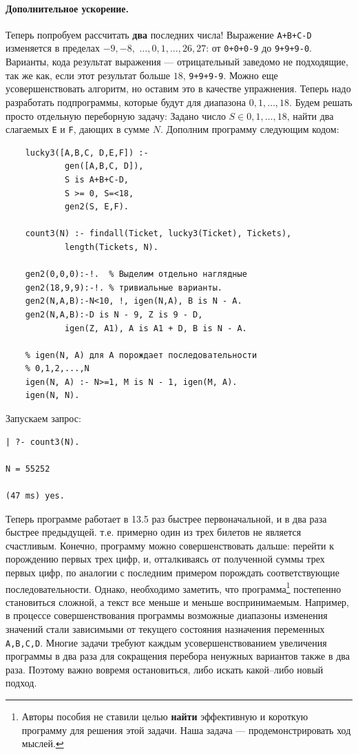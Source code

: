 \documentclass[12pt, openany, oneside]{book} %
\begin{document}
\paragraph{Дополнительное ускорение.} Теперь попробуем рассчитать \textbf{два} последних числа! Выражение \texttt{A+B+C-D} изменяется в пределах $-9,-8,$ $\ldots,0,1,\ldots,26,27$: от \texttt{0+0+0-9} до \texttt{9+9+9-0}. Варианты, кода результат выражения --- отрицательный заведомо не подходящие, так же как, если этот результат больше $18$, \texttt{9+9+9-9}. Можно еще усовершенствовать алгоритм, но оставим это в качестве упражнения. Теперь надо разработать подпрограммы, которые будут для диапазона $0,1,\ldots,18$. Будем решать просто отдельную переборную задачу: Задано число $S \in 0,1,\ldots,18$, найти два слагаемых \texttt{E} и \texttt{F}, дающих в сумме $N$. Дополним программу следующим кодом:
{\tt\begin{verbatim}
    lucky3([A,B,C, D,E,F]) :-
            gen([A,B,C, D]),
            S is A+B+C-D,
            S >= 0, S=<18,
            gen2(S, E,F).

    count3(N) :- findall(Ticket, lucky3(Ticket), Tickets),
            length(Tickets, N).

    gen2(0,0,0):-!.  % Выделим отдельно наглядные
    gen2(18,9,9):-!. % тривиальные варианты.
    gen2(N,A,B):-N<10, !, igen(N,A), B is N - A.
    gen2(N,A,B):-D is N - 9, Z is 9 - D,
            igen(Z, A1), A is A1 + D, B is N - A.

    % igen(N, A) для A порождает последовательности
    % 0,1,2,...,N
    igen(N, A) :- N>=1, M is N - 1, igen(M, A).
    igen(N, N).
\end{verbatim}}
\noindent{} Запускаем запрос:
{\tt\begin{verbatim}
| ?- count3(N).

N = 55252

(47 ms) yes.
\end{verbatim}}
\noindent{}Теперь программе работает в 13.5 раз быстрее первоначальной, и в два раза быстрее предыдущей. т.е. примерно один из трех билетов не является счастливым. Конечно, программу можно совершенствовать дальше: перейти к порождению первых трех цифр, и, отталкиваясь от полученной суммы трех первых цифр, по аналогии с последним примером порождать соответствующие последовательности. Однако, необходимо заметить, что программа\footnote{Авторы пособия не ставили целью \textbf{найти} эффективную и короткую программу для решения этой задачи. Наша задача --- продемонстрировать ход мыслей.} постепенно становиться сложной, а текст все меньше и меньше воспринимаемым. Например, в процессе совершенствования программы возможные диапазоны изменения значений стали зависимыми от текущего состояния назначения переменных \texttt{A,B,C,D}. Многие задачи требуют каждым усовершенствованием увеличения программы в два раза для сокращения перебора ненужных вариантов также в два раза. Поэтому важно вовремя остановиться, либо искать какой--либо новый подход.
\end{document}
